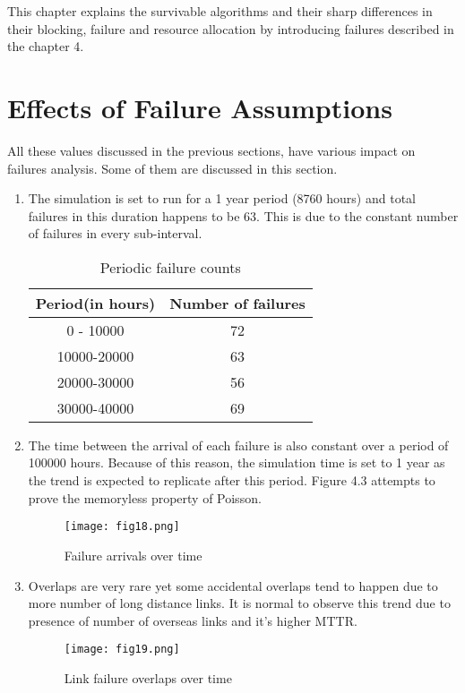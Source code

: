 
\noindent 
This chapter explains the survivable algorithms and their sharp differences in their blocking, failure and resource allocation by introducing failures described in the chapter 4.

\section {Effects of Failure Assumptions}

All these values discussed in the previous sections, have various impact on failures analysis. Some of them are discussed in this section.
\begin{enumerate} [leftmargin=*]
\item The simulation is set to run for a 1 year period (8760 hours) and total failures in this duration happens to be 63. This is due to the constant number of failures in every sub-interval.

\begin{table}[!htbp]
\centering
\caption{Periodic failure counts}
 	\begin{tabular}{|c|c|}
	\hline\hline
	\textbf{Period(in hours)} & \textbf{Number of failures}\\
	\hline
	0 - 10000&72\\
	10000-20000&63\\
	20000-30000&56\\
	30000-40000&69\\
	\hline
	\end{tabular}
\end{table}

\item The time between the arrival of each failure is also constant over a period of 100000 hours. Because of this reason, the simulation time is set to 1 year as the trend is expected to replicate after this period. Figure 4.3 attempts to prove the memoryless property of Poisson.

\begin{figure}[hbt!]
\centering
\texttt{[image: fig18.png]}
\caption{Failure arrivals over time}
\label{fig:failureArrivals}
\end{figure}

\item Overlaps are very rare yet some accidental overlaps tend to happen due to more number of long distance links. It is normal to observe this trend due to presence of number of overseas links and it's higher MTTR.
\begin{figure}[hbt!]
\centering
\texttt{[image: fig19.png]}
\caption{Link failure overlaps over time}
\label{fig:failOverlaps}
\end{figure}

\end{enumerate}

